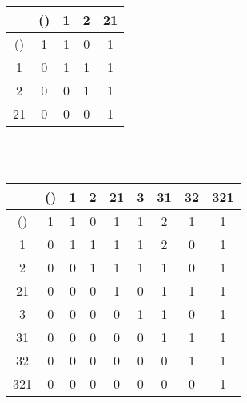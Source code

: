 \hspace*{-0.6in}
\begin{tabular}{|c|c|c|c|c|}
\hline
&()&1&2&21\\ \hline
()&1&1&0&1\\
1&0&1&1&1\\
2&0&0&1&1\\
21&0&0&0&1\\
\hline
\end{tabular}
\\
\vspace*{1cm}
\\\hspace*{-0.6in}
\begin{tabular}{|c|c|c|c|c|c|c|c|c|}
\hline
&()&1&2&21&3&31&32&321\\ \hline
()&1&1&0&1&1&2&1&1\\
1&0&1&1&1&1&2&0&1\\
2&0&0&1&1&1&1&0&1\\
21&0&0&0&1&0&1&1&1\\
3&0&0&0&0&1&1&0&1\\
31&0&0&0&0&0&1&1&1\\
32&0&0&0&0&0&0&1&1\\
321&0&0&0&0&0&0&0&1\\
\hline
\end{tabular}
\\
\vspace*{1cm}
\\\hspace*{-0.6in}
